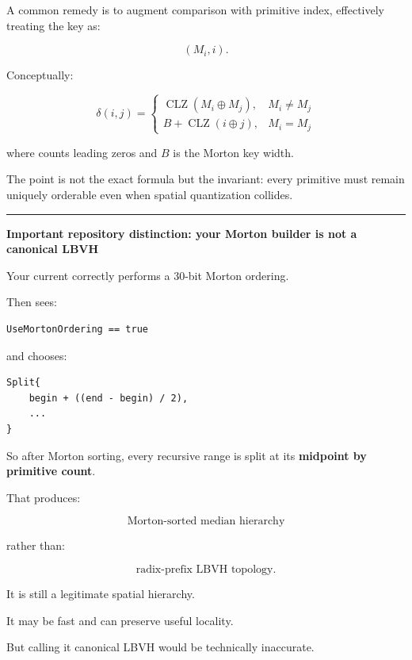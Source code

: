 A common remedy is to augment comparison with primitive index, effectively treating the key as:

\[
(M_i,i).
\]

Conceptually:

\[
\delta(i,j)
=
\begin{cases}
\operatorname{CLZ}(M_i\oplus M_j), & M_i\ne M_j\\
B+\operatorname{CLZ}(i\oplus j), & M_i=M_j
\end{cases}
\]

where  counts leading zeros and \(B\) is the Morton key width.

The point is not the exact formula but the invariant: every primitive must remain uniquely orderable even when spatial quantization collides.

\begin{center}\rule{0.5\linewidth}{0.5pt}\end{center}

\textbf{Important repository distinction: your Morton builder is not a canonical LBVH}

Your current  correctly performs a 30-bit Morton ordering.

Then  sees:

\begin{verbatim}
UseMortonOrdering == true
\end{verbatim}

and chooses:

\begin{verbatim}
Split{
    begin + ((end - begin) / 2),
    ...
}
\end{verbatim}

So after Morton sorting, every recursive range is split at its \textbf{midpoint by primitive count}.

That produces:

\[
\boxed{\text{Morton-sorted median hierarchy}}
\]

rather than:

\[
\boxed{\text{radix-prefix LBVH topology}}.
\]

It is still a legitimate spatial hierarchy.

It may be fast and can preserve useful locality.

But calling it canonical LBVH would be technically inaccurate.

